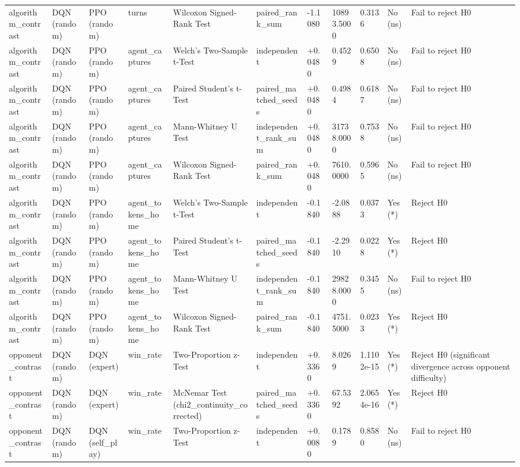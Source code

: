 \begin{table}
\begin{tabular}{lllllllllll}
algorithm\_contrast & DQN (random) & PPO (random) & turns & Wilcoxon Signed-Rank Test & paired\_rank\_sum & -1.1080 & 10893.5000 & 0.3136 & No (ns) & Fail to reject H0 \\
algorithm\_contrast & DQN (random) & PPO (random) & agent\_captures & Welch's Two-Sample t-Test & independent & +0.0480 & 0.4529 & 0.6508 & No (ns) & Fail to reject H0 \\
algorithm\_contrast & DQN (random) & PPO (random) & agent\_captures & Paired Student's t-Test & paired\_matched\_seeds & +0.0480 & 0.4984 & 0.6187 & No (ns) & Fail to reject H0 \\
algorithm\_contrast & DQN (random) & PPO (random) & agent\_captures & Mann-Whitney U Test & independent\_rank\_sum & +0.0480 & 31738.0000 & 0.7538 & No (ns) & Fail to reject H0 \\
algorithm\_contrast & DQN (random) & PPO (random) & agent\_captures & Wilcoxon Signed-Rank Test & paired\_rank\_sum & +0.0480 & 7610.0000 & 0.5965 & No (ns) & Fail to reject H0 \\
algorithm\_contrast & DQN (random) & PPO (random) & agent\_tokens\_home & Welch's Two-Sample t-Test & independent & -0.1840 & -2.0888 & 0.0373 & Yes (*) & Reject H0 \\
algorithm\_contrast & DQN (random) & PPO (random) & agent\_tokens\_home & Paired Student's t-Test & paired\_matched\_seeds & -0.1840 & -2.2910 & 0.0228 & Yes (*) & Reject H0 \\
algorithm\_contrast & DQN (random) & PPO (random) & agent\_tokens\_home & Mann-Whitney U Test & independent\_rank\_sum & -0.1840 & 29828.0000 & 0.3455 & No (ns) & Fail to reject H0 \\
algorithm\_contrast & DQN (random) & PPO (random) & agent\_tokens\_home & Wilcoxon Signed-Rank Test & paired\_rank\_sum & -0.1840 & 4751.5000 & 0.0233 & Yes (*) & Reject H0 \\
opponent\_contrast & DQN (random) & DQN (expert) & win\_rate & Two-Proportion z-Test & independent & +0.3360 & 8.0269 & 1.1102e-15 & Yes (*) & Reject H0 (significant divergence across opponent difficulty) \\
opponent\_contrast & DQN (random) & DQN (expert) & win\_rate & McNemar Test (chi2\_continuity\_corrected) & paired\_matched\_seeds & +0.3360 & 67.5392 & 2.0654e-16 & Yes (*) & Reject H0 \\
opponent\_contrast & DQN (random) & DQN (self\_play) & win\_rate & Two-Proportion z-Test & independent & +0.0080 & 0.1789 & 0.8580 & No (ns) & Fail to reject H0 \\

\end{tabular}
\end{table}
